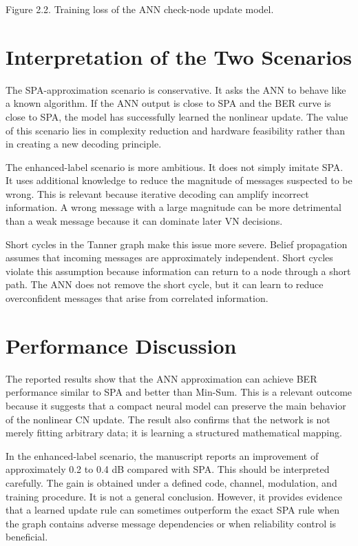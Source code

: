 Figure 2.2. Training loss of the ANN check-node update model.

\section{Interpretation of the Two Scenarios}
The SPA-approximation scenario is conservative. It asks the ANN to behave like a known algorithm. If the ANN output is close to SPA and the BER curve is close to SPA, the model has successfully learned the nonlinear update. The value of this scenario lies in complexity reduction and hardware feasibility rather than in creating a new decoding principle.

The enhanced-label scenario is more ambitious. It does not simply imitate SPA. It uses additional knowledge to reduce the magnitude of messages suspected to be wrong. This is relevant because iterative decoding can amplify incorrect information. A wrong message with a large magnitude can be more detrimental than a weak message because it can dominate later VN decisions.

Short cycles in the Tanner graph make this issue more severe. Belief propagation assumes that incoming messages are approximately independent. Short cycles violate this assumption because information can return to a node through a short path. The ANN does not remove the short cycle, but it can learn to reduce overconfident messages that arise from correlated information.

\section{Performance Discussion}
The reported results show that the ANN approximation can achieve BER performance similar to SPA and better than Min-Sum. This is a relevant outcome because it suggests that a compact neural model can preserve the main behavior of the nonlinear CN update. The result also confirms that the network is not merely fitting arbitrary data; it is learning a structured mathematical mapping.

In the enhanced-label scenario, the manuscript reports an improvement of approximately 0.2 to 0.4 dB compared with SPA. This should be interpreted carefully. The gain is obtained under a defined code, channel, modulation, and training procedure. It is not a general conclusion. However, it provides evidence that a learned update rule can sometimes outperform the exact SPA rule when the graph contains adverse message dependencies or when reliability control is beneficial.


